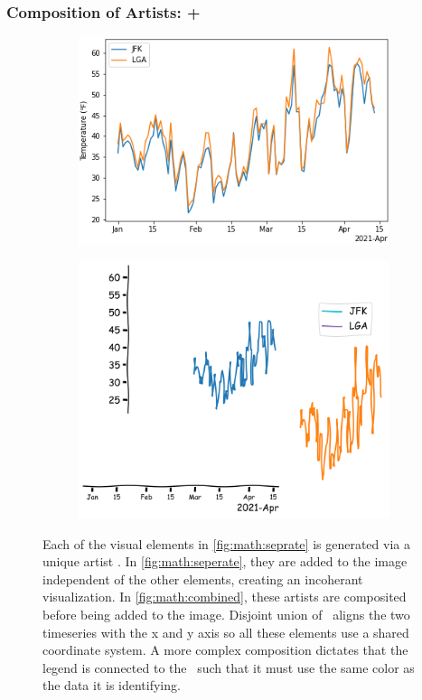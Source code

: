\documentclass[../main.tex]{subfiles}
\begin{document}
\subsubsection{Composition of Artists: +}
\begin{figure}[H]
\begin{subfigure}{.5\textwidth}
    \includegraphics[width=1\textwidth]{figures/math/combined_artist.png}
    \caption{}
    \label{fig:math:combined}    
\end{subfigure}
\begin{subfigure}{.5\textwidth}
    \includegraphics[width=1\textwidth]{figures/math/exploding_artist.png}
    \caption{}
    \label{fig:math:seperate}
\end{subfigure}
\caption{Each of the visual elements in \autoref{fig:math:seprate} is generated via a unique artist \vartist. In \autoref{fig:math:seperate}, they are added to the image independent of the other elements, creating an incoherant visualization. In \autoref{fig:math:combined}, these artists are composited before being added to the image. Disjoint union of \dtotal\ aligns the two timeseries with the x and y axis so all these elements use a shared coordinate system. A more complex composition dictates that the legend is connected to the \dtotal\ such that it must use the same color as the data it is identifying.}
\label{fig:artist_plus}
\end{figure}
\end{document}

